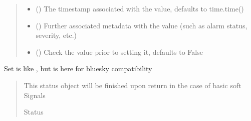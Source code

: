 \documentclass[letterpaper,10pt,english]{sphinxmanual}
\begin{document}
\begin{fulllineitems}
\begin{fulllineitems}
\begin{quote}
\begin{description}
\begin{itemize}
\item {} 
\sphinxAtStartPar
{} (\sphinxstyleliteralemphasis{\sphinxupquote{, }}) \textendash{} The timestamp associated with the value, defaults to time.time()

\item {} 
\sphinxAtStartPar
{} (\sphinxstyleliteralemphasis{\sphinxupquote{, }}) \textendash{} Further associated metadata with the value (such as alarm status,
severity, etc.)

\item {} 
\sphinxAtStartPar
{} (\sphinxstyleliteralemphasis{\sphinxupquote{, }}) \textendash{} Check the value prior to setting it, defaults to False

\end{itemize}

\end{description}\end{quote}

\end{fulllineitems}


\begin{fulllineitems}
\label{\detokenize{API:raypyng_bluesky.detector.RaypyngTriggerDetector.set}}
\pysigstartsignatures
{}
\pysigstopsignatures
\sphinxAtStartPar
Set is like , but is here for bluesky compatibility
\begin{quote}\begin{description}
\sphinxAtStartPar
{} \textendash{} This status object will be finished upon return in the
case of basic soft Signals

\sphinxAtStartPar
Status


\end{description}
\end{quote}
\end{fulllineitems}
\end{fulllineitems}
\end{document}
